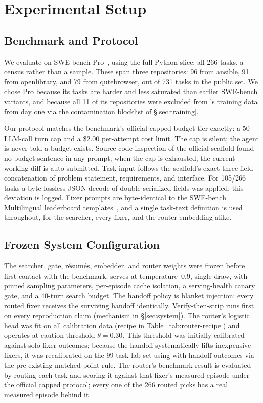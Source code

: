 \section{Experimental Setup}
\label{sec:setup}

\subsection{Benchmark and Protocol}
\label{sec:setup-bench}

We evaluate on SWE-bench Pro~\citep{swebenchpro}, using the full Python
slice: all 266 tasks, a census rather than a sample.  These span three
repositories: 96 from ansible, 91 from openlibrary, and 79 from
qutebrowser, out of 731 tasks in the public set.  We chose Pro because
its tasks are harder and less saturated than earlier SWE-bench variants,
and because all 11 of its repositories were excluded from \modelname's
training data from day one via the contamination blocklist of
\S\ref{sec:training}.

Our protocol matches the benchmark's official capped budget tier
exactly: a 50-LLM-call turn cap and a \$2.00 per-attempt cost limit.
The cap is silent; the agent is never told a budget exists.
Source-code inspection of the official scaffold found no budget
sentence in any prompt; when the cap is exhausted, the current working
diff is auto-submitted.  Task input follows the scaffold's exact
three-field concatenation of problem statement, requirements, and
interface.  For 105/266 tasks a byte-lossless JSON decode of
double-serialized fields was applied; this deviation is logged.  Fixer
prompts are byte-identical to the SWE-bench Multilingual leaderboard
templates~\citep{swebenchmultilingual}, and a single task-text
definition is used throughout, for the searcher, every fixer, and the
router embedding alike.

\subsection{Frozen System Configuration}
\label{sec:setup-frozen}

The searcher, gate, r\'esum\'es, embedder, and router weights were
frozen before first contact with the benchmark.  \modelname serves at
temperature~0.9, single draw, with pinned sampling parameters,
per-episode cache isolation, a serving-health canary gate, and a 40-turn
search budget.  The handoff policy is blanket injection: every routed
fixer receives the surviving handoff identically.  Verify-then-strip
runs first on every reproduction claim (mechanism in
\S\ref{sec:system}).  The router's logistic head was fit on all
calibration data (recipe in Table~\ref{tab:router-recipe}) and operates
at caution threshold $\theta{=}0.30$.  This threshold was initially
calibrated against solo-fixer outcomes; because the handoff
systematically lifts inexpensive fixers, it was recalibrated on the
99-task lab set using with-handoff outcomes via the pre-existing
matched-point rule.  The router's benchmark result is evaluated by
routing each task and scoring it against that fixer's measured episode
under the official capped protocol; every one of the 266 routed picks
has a real measured episode behind it.

